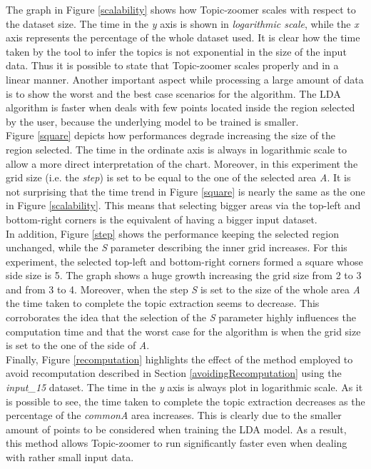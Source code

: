 \documentclass{sig-alternate-05-2015}
\begin{document}
The graph in Figure \ref{scalability} shows how Topic-zoomer scales with respect to the dataset size. The time in the \emph{y} axis is shown in \emph{logarithmic scale}, while the \emph{x} axis represents the percentage of the whole dataset used. It is clear how the time taken by the tool to infer the topics is not exponential in the size of the input data. Thus it is possible to state that Topic-zoomer scales properly and in a linear manner.  
Another important aspect while processing a large amount of data is to show the worst and the best case scenarios for the algorithm. The LDA algorithm is faster when deals with few points located inside the region selected by the user, because the underlying model to be trained is smaller.\\
Figure \ref{square} depicts how performances degrade increasing the size of the region selected. The time in the ordinate axis is always in logarithmic scale to allow a more direct interpretation of the chart. Moreover, in this experiment the grid size (i.e. the \emph{step}) is set to be equal to the one of the selected area \emph{A}. It is not surprising that the time trend in Figure \ref{square} is nearly the same as the one in Figure \ref{scalability}. This means that selecting bigger areas via the top-left and bottom-right corners is the equivalent of having a bigger input dataset.\\  
In addition, Figure \ref{step} shows the performance keeping the selected region unchanged, while the \emph{S} parameter describing the inner grid increases. For this experiment, the selected top-left and bottom-right corners formed a square whose side size is 5. The graph shows a huge growth increasing the grid size from 2 to 3 and from 3 to 4. Moreover, when the step \emph{S} is set to the size of the whole area \emph{A} the time taken to complete the topic extraction seems to decrease. This corroborates the idea that the selection of the \emph{S} parameter highly influences the computation time and that the worst case for the algorithm is when the grid size is set to the one of the side of \emph{A}.\\
Finally, Figure \ref{recomputation} highlights the effect of the method employed to avoid recomputation described in Section \ref{avoidingRecomputation} using the \emph{input\_15} dataset. The time in the \emph{y} axis is always plot in logarithmic scale. As it is possible to see, the time taken to complete the topic extraction decreases as the percentage of the \emph{commonA} area increases. This is clearly due to the smaller amount of points to be considered when training the LDA model. As a result, this method allows Topic-zoomer to run significantly faster even when dealing with rather small input data. 
\end{document}
